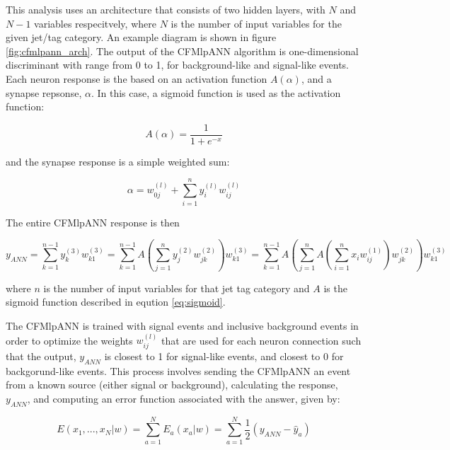 \par This analysis uses an architecture that consists of two hidden
layers, with $N$ and $N-1$ variables respecitvely, where $N$ is the
number of input variables for the given jet/tag category.  An example
diagram is shown in figure \ref{fig:cfmlpann_arch}.  The output of the
CFMlpANN algorithm is one-dimensional discriminant with range from 0
to 1, for background-like and signal-like events.  Each neuron
response is the based on an activation function $A(\alpha)$, and a synapse
repsonse, $\alpha$.  In this case, a sigmoid function is used as
the activation function:

\begin{equation}\label{eq:sigmoid}
A(\alpha) = \frac{1}{1+e^{-x}}
\end{equation}

\noindent and the synapse response is a simple weighted sum:

\begin{equation}\label{eq:ann_synapse}
\alpha = w_{0j}^{(l)} + \sum_{i=1}^{n}y_{i}^{(l)}w_{ij}^{(l)} 
\end{equation}

\noindent The entire CFMlpANN response is then 

\begin{equation}\label{eq:ann_output}
y_{ANN} = \sum_{k=1}^{n-1}y_{k}^{(3)}w_{k1}^{(3)} = \sum_{k=1}^{n-1}A\left(
\sum_{j=1}^{n}y_{j}^{(2)}w_{jk}^{(2)}\right)w_{k1}^{(3)} = \sum_{k=1}^{n-1}A\left(
\sum_{j=1}^{n}A\left(\sum_{i=1}^{n}x_{i}w_{ij}^{(1)}\right)w_{jk}^{(2)}\right)w_{k1}^{(3)}
\end{equation}
 
\noindent where $n$ is the number of input variables for that jet tag
category and $A$ is the sigmoid function described in eqution
\ref{eq:sigmoid}.  

\par The CFMlpANN is trained with \ttH signal events and inclusive
\ttjets background events in order to optimize the weights
$w_{ij}^{(l)}$ that are used for each neuron connection such that the
output, $y_{ANN}$ is closest to 1 for signal-like events, and closest
to 0 for backgorund-like events.  This process involves sending the
CFMlpANN an event from a known source (either signal or background),
calculating the response, $y_{ANN}$, and computing an error function
associated with the answer, given by:

\begin{equation}\label{eq:ann_err}
E(x_{1},...,x_{N}|w) = \sum_{a=1}^{N}E_{a}(x_{a}|w) =
\sum_{a=1}^{N}\frac{1}{2}(y_{ANN} - \hat{y}_{a})
\end{equation}

